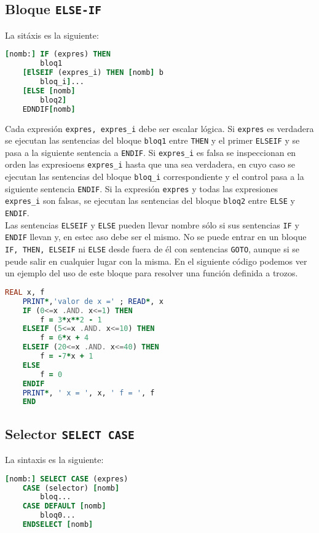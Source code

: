 \subsection{Bloque {\tt ELSE-IF}}

La sitáxis es la siguiente:

\begin{lstlisting}[language=Fortran]
	[nomb:] IF (expres) THEN 
		bloq1 
	[ElSEIF (expres_i) THEN [nomb] b
		bloq_i]...
	[ELSE [nomb]
		bloq2]
	EDNDIF[nomb] 
\end{lstlisting}

Cada expresión {\tt expres, expres\_i} debe ser escalar lógica. Si {\tt expres} es verdadera se ejecutan las sentencias del bloque {\tt bloq1} entre {\tt THEN} y el primer {\tt ELSEIF} y se pasa a la siguiente sentencia a \texttt{ENDIF}. Si \texttt{expres\_i} es falsa se inspeccionan en orden las expresioens \texttt{expres\_i} hasta que una sea verdadera, en cuyo caso se ejecutan las sentencias del bloque {\tt bloq\_i} correspondiente y el control pasa a la siguiente sentencia \texttt{ENDIF}. Si la expresión {\tt expres} y todas las expresiones {\tt expres\_i} son falsas, se ejecutan las sentencias del bloque \texttt{bloq2} entre {\tt ELSE} y {\tt ENDIF}. \\

Las sentencias {\tt ELSEIF} y {\tt ELSE} pueden llevar nombre sólo si sus sentencias {\tt IF} y {\tt ENDIF} llevan y, en estec aso debe ser el mismo. No se puede entrar en un bloque {\tt IF, THEN, ELSEIF} ni {\tt ELSE} desde fuera de él con sentencias {\tt GOTO}, aunque si se peude salir en cualquier lugar con la misma. En el siguiente código podemos ver un ejemplo del uso de este bloque para resolver una función definida a trozos.

\begin{lstlisting}[language=Fortran]
	REAL x, f
	PRINT*,'valor de x =' ; READ*, x
	IF (0<=x .AND. x<=1) THEN
		f = 3*x**2 - 1
	ELSEIF (5<=x .AND. x<=10) THEN
		f = 6*x + 4
	ELSEIF (20<=x .AND. x<=40) THEN
		f = -7*x + 1
	ELSE
		f = 0
	ENDIF
	PRINT*, ' x = ', x, ' f = ', f
	END
\end{lstlisting}


\subsection{Selector {\tt SELECT CASE}}

La sintaxis es la siguiente:

\begin{lstlisting}[language=Fortran]
	[nomb:] SELECT CASE (expres) 
	CASE (selector) [nomb]
		bloq... 
	CASE DEFAULT [nomb]
		bloq0... 
	ENDSELECT [nomb]
\end{lstlisting}

